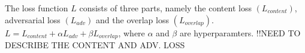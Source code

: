 \documentclass[12pt,a4paper,twocolumn]{article}
\begin{document}
         The loss function $L$ consists of three parts, namely the content loss $(L_{content})$, adversarial loss $(L_{adv})$ and the overlap loss $(L_{overlap})$.\\
        $L = L_{content} + \alpha L_{adv} + \beta L_{overlap}$, where $\alpha$ and $\beta$ are hyperparamters. 
        !!NEED TO DESCRIBE THE CONTENT AND ADV. LOSS
    
    




    
    
\end{document}
